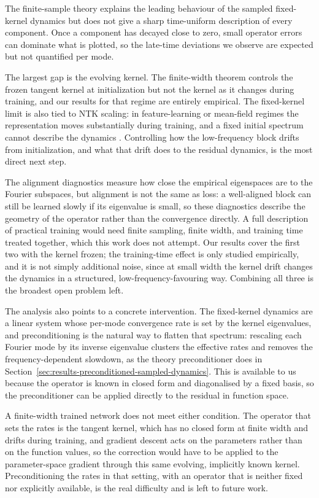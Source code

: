 The finite-sample theory explains the leading behaviour of the sampled
fixed-kernel dynamics but does not give a sharp time-uniform description of every
component. Once a component has decayed close to zero, small operator errors can
dominate what is plotted, so the late-time deviations we observe are expected but
not quantified per mode.

The largest gap is the evolving kernel. The finite-width theorem controls the
frozen tangent kernel at initialization but not the kernel as it changes during
training, and our results for that regime are entirely empirical. The fixed-kernel
limit is also tied to NTK scaling: in feature-learning or mean-field regimes the
representation moves substantially during training, and a fixed initial spectrum
cannot describe the dynamics \citep{Mei2018meanfieldview,
	chizat2018globalconvergencegradientdescent}. Controlling how the low-frequency
block drifts from initialization, and what that drift does to the residual
dynamics, is the most direct next step.

The alignment diagnostics measure how close the empirical eigenspaces are to
the Fourier subspaces, but alignment is not the same as loss: a well-aligned
block can still be learned slowly if its eigenvalue is small, so these
diagnostics describe the geometry of the operator rather than the convergence
directly. A full description of practical training would need finite sampling,
finite width, and training time treated together, which this work does not
attempt. Our results cover the first two with the kernel frozen; the
training-time effect is only studied empirically, and it is not simply
additional noise, since at small width the kernel drift changes the dynamics in
a structured, low-frequency-favouring way. Combining all three is the broadest
open problem left.

The analysis also points to a concrete intervention. The fixed-kernel dynamics are
a linear system whose per-mode convergence rate is set by the kernel eigenvalues,
and preconditioning is the natural way to flatten that spectrum: rescaling each
Fourier mode by its inverse eigenvalue clusters the effective rates and removes the
frequency-dependent slowdown, as the theory preconditioner does in
Section~\ref{sec:results-preconditioned-sampled-dynamics}. This is available to us
because the operator is known in closed form and diagonalised by a fixed basis, so
the preconditioner can be applied directly to the residual in function space.

A finite-width trained network does not meet either condition. The operator that
sets the rates is the tangent kernel, which has no closed form at finite width and
drifts during training, and gradient descent acts on the parameters rather than on
the function values, so the correction would have to be applied to the
parameter-space gradient through this same evolving, implicitly known kernel.
Preconditioning the rates in that setting, with an operator that is neither fixed
nor explicitly available, is the real difficulty and is left to future work.

